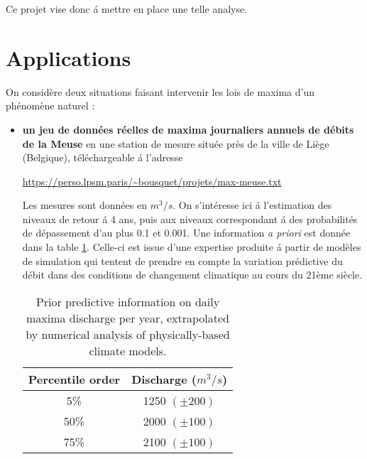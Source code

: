 \documentclass[10pt]{article}
\newcommand{\1}{\mathbbm{1}}
\begin{document}
Ce projet vise donc \'a mettre en place une telle analyse.


\section{Applications}

On consid\`ere deux situations faisant intervenir les lois de maxima d'un ph\'enom\`ene naturel : \\

\begin{itemize}
\item {\bf un jeu de donn\'ees r\'eelles de maxima journaliers annuels de d\'ebits de la Meuse} en une station de mesure situ\'ee pr\`es de la ville de Li\`ege (Belgique), t\'el\'echargeable \'a l'adresse \\
\begin{center}
\url{https://perso.lpsm.paris/~bousquet/projets/max-meuse.txt} \\
\end{center}

\vspace{0.5cm}

Les mesures sont donn\'ees en $m^3/s$. On s'int\'eresse ici \'a l'estimation des niveaux de retour \'a 4 ans, puis aux niveaux correspondant \'a des probabilit\'es de d\'epassement d'au plus 0.1 et 0.001. Une information {\it a priori} est donn\'ee dans la table \ref{expertise-meuse}. Celle-ci est issue d'une expertise produite \'a partir de mod\`eles de simulation qui tentent de prendre en compte la variation pr\'edictive du d\'ebit dans des conditions de changement climatique au cours du 21\`eme si\`ecle. \\

\begin{table}[hbtp]
\centering
\begin{tabular}{cc}
Percentile order     & Discharge ($m^3/s$) \\
 \hline
5\%   &  1250  $(\pm 200)$ \\ 
50\%  &  2000 $(\pm 100)$ \\
75\%    & 2100 $(\pm 100)$ \\
\hline
\end{tabular}
\caption{Prior predictive information on daily maxima discharge  per year, extrapolated by numerical analysis of physically-based climate models. }
\label{expertise-meuse}
\end{table}

\vspace{1cm}
 

\end{itemize}
\end{document}
